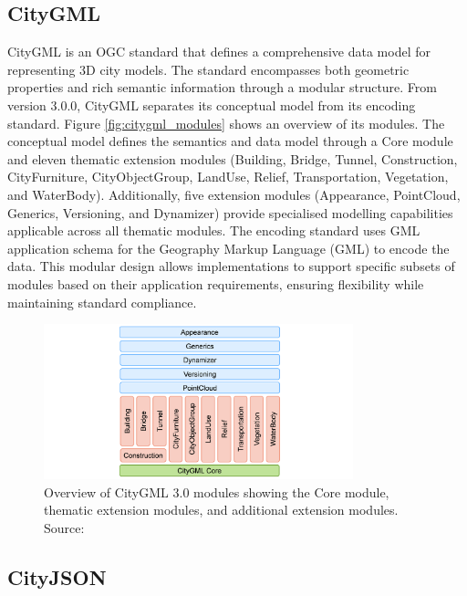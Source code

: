 \subsection{CityGML}
\label{rw:citygml}
CityGML is an OGC standard \citep{CityGML} that defines a comprehensive data model for representing 3D city models. The standard encompasses both geometric properties and rich semantic information through a modular structure. From version 3.0.0, CityGML separates its conceptual model from its encoding standard. Figure \autoref{fig:citygml_modules} shows an overview of its modules. The conceptual model defines the semantics and data model through a Core module and eleven thematic extension modules (Building, Bridge, Tunnel, Construction, CityFurniture, CityObjectGroup, LandUse, Relief, Transportation, Vegetation, and WaterBody). Additionally, five extension modules (Appearance, PointCloud, Generics, Versioning, and Dynamizer) provide specialised modelling capabilities applicable across all thematic modules. The encoding standard uses GML application schema for the Geography Markup Language (GML) \citep{gml} to encode the data. This modular design allows implementations to support specific subsets of modules based on their application requirements, ensuring flexibility while maintaining standard compliance.

\begin{figure}[htbp]
  \centering
  \includegraphics[width=0.8\textwidth]{figs/related_work_theoretical_bg/citygml3modules.png}
  \caption[CityGML 3.0 Module Overview]{Overview of CityGML 3.0 modules showing the Core module, thematic extension modules, and additional extension modules. Source: \citep{CityGML}}
  \label{fig:citygml_modules}
\end{figure}

\subsection{CityJSON}
\label{rw:cityjson}

